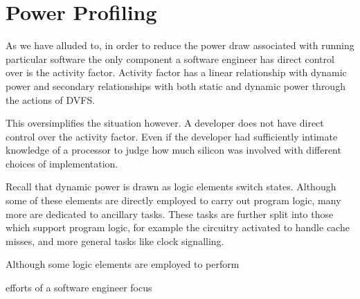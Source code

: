 \section{Power Profiling}


As we have alluded to, in order to reduce the power draw associated with running particular software the only  component a software engineer has direct control over is the activity factor. Activity factor has a linear relationship with dynamic power and secondary relationships with both static and dynamic power through the actions of DVFS.

This oversimplifies the situation however. A developer does not have direct control over the activity factor. Even if the developer had sufficiently intimate knowledge of a processor to judge how much silicon was involved with different choices of implementation.


Recall that dynamic power is drawn as logic elements switch states. Although some of these elements are directly employed to carry out program logic, many more are dedicated to ancillary tasks. These tasks are further split into those which support program logic, for example the circuitry activated to handle cache misses, and more general tasks like clock signalling.

Although some logic elements are employed to perform 



 efforts of a software engineer focus 



\label{sec:profiling}


